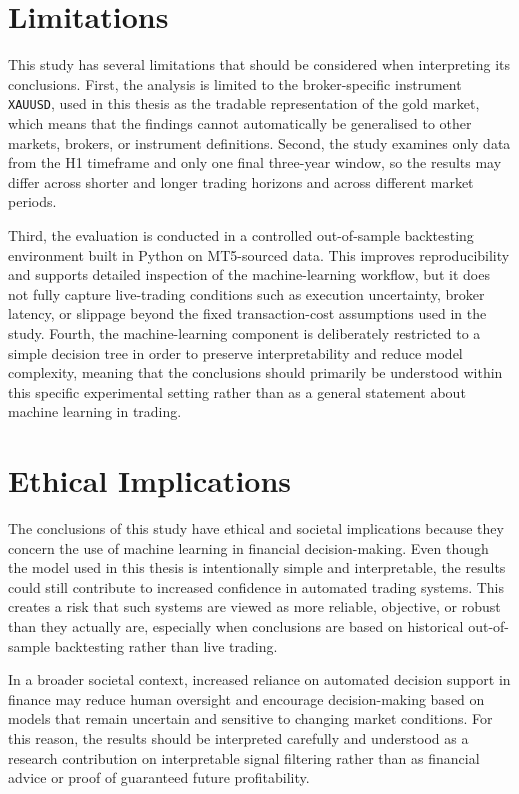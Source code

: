 \section{Limitations}

This study has several limitations that should be considered when interpreting
its conclusions. First, the analysis is limited to the broker-specific
instrument \texttt{XAUUSD}, used in this thesis as the tradable representation
of the gold market, which means that the findings cannot automatically be
generalised to other markets, brokers, or instrument definitions. Second, the
study examines only data from the H1 timeframe and only one final three-year
window, so the results may differ across shorter and longer trading horizons
and across different market periods.

Third, the evaluation is conducted in a controlled out-of-sample backtesting
environment built in Python on MT5-sourced data. This improves reproducibility
and supports detailed inspection of the machine-learning workflow, but it does
not fully capture live-trading conditions such as execution uncertainty, broker
latency, or slippage beyond the fixed transaction-cost assumptions used in the
study. Fourth, the machine-learning component is deliberately restricted to a
simple decision tree in order to preserve interpretability and reduce model
complexity, meaning that the conclusions should primarily be understood within
this specific experimental setting rather than as a general statement about
machine learning in trading.

\section{Ethical Implications}

The conclusions of this study have ethical and societal implications because
they concern the use of machine learning in financial decision-making. Even
though the model used in this thesis is intentionally simple and interpretable,
the results could still contribute to increased confidence in automated trading
systems. This creates a risk that such systems are viewed as more reliable,
objective, or robust than they actually are, especially when conclusions are
based on historical out-of-sample backtesting rather than live trading.

In a broader societal context, increased reliance on automated decision support
in finance may reduce human oversight and encourage decision-making based on
models that remain uncertain and sensitive to changing market conditions. For
this reason, the results should be interpreted carefully and understood as a
research contribution on interpretable signal filtering rather than as financial
advice or proof of guaranteed future profitability.

